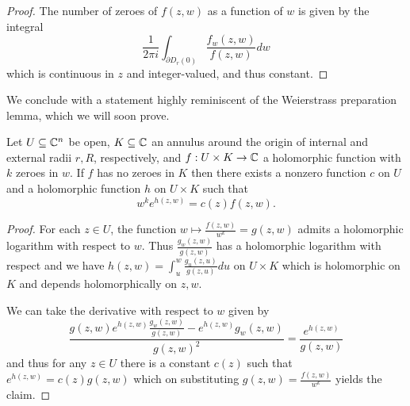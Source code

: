 \begin{proof}
    The number of zeroes of $f(z,w)$ as a function of $w$ is given by the integral 
    $$\frac{1}{2\pi i}\int_{\partial D_{r}(0)}\frac{f_{w}(z,w)}{f(z,w)}dw$$
    which is continuous in $z$ and integer-valued, and thus constant. 
\end{proof}
We conclude with a statement highly reminiscent of the Weierstrass preparation lemma, which we will soon prove. 
\begin{proposition}\label{prop: pre-Weierstrass preparation}
    Let $U\subseteq\mathbb{C}^{n}$ be open, $K\subseteq\mathbb{C}$ an annulus around the origin of internal and external radii $r,R$, respectively, and $f:U\times K\to \mathbb{C}$ a holomorphic function with $k$ zeroes in $w$. If $f$ has no zeroes in $K$ then there exists a nonzero function $c$ on $U$ and a holomorphic function $h$ on $U\times K$ such that 
    $$w^{k}e^{h(z,w)}=c(z)f(z,w).$$
\end{proposition}
\begin{proof}
    For each $z\in U$, the function $w\mapsto\frac{f(z,w)}{w^{k}}=g(z,w)$ admits a holomorphic logarithm with respect to $w$. Thus $\frac{g_{w}(z,w)}{g(z,w)}$ has a holomorphic logarithm with respect and we have $h(z,w)=\int_{u}^{w}\frac{g_{u}(z,u)}{g(z,u)}du$ on $U\times K$ which is holomorphic on $K$ and depends holomorphically on $z,w$. 

    We can take the derivative with respect to $w$ given by 
    $$\frac{g(z,w)e^{h(z,w)}\frac{g_{w}(z,w)}{g(z,w)}-e^{h(z,w)}g_{w}(z,w)}{g(z,w)^{2}}=\frac{e^{h(z,w)}}{g(z,w)}$$
    and thus for any $z\in U$ there is a constant $c(z)$ such that $e^{h(z,w)}=c(z)g(z,w)$ which on substituting $g(z,w)=\frac{f(z,w)}{w^{k}}$ yields the claim. 
\end{proof}